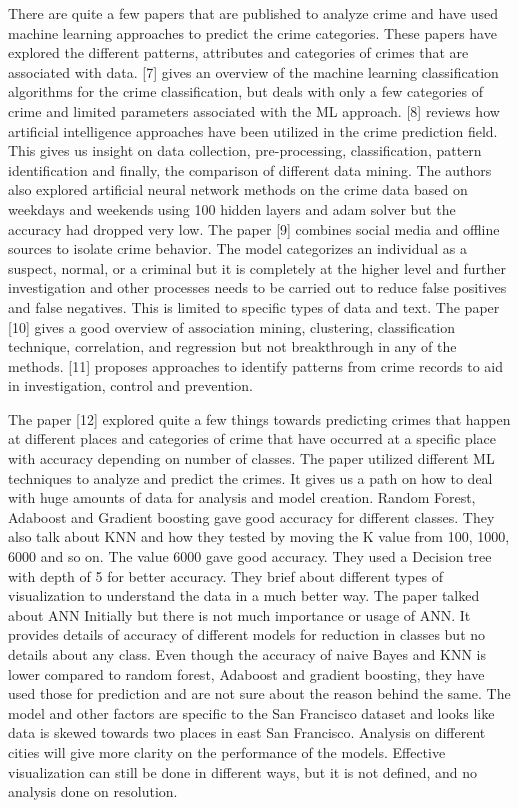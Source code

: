 \documentclass[11 pt,conference,final,]{IEEEtran}
\begin{document}
There are quite a few papers that are published to analyze crime and
have used machine learning approaches to predict the crime categories.
These papers have explored the different patterns, attributes and
categories of crimes that are associated with data. {[}7{]} gives an
overview of the machine learning classification algorithms for the crime
classification, but deals with only a few categories of crime and
limited parameters associated with the ML approach. {[}8{]} reviews how
artificial intelligence approaches have been utilized in the crime
prediction field. This gives us insight on data collection,
pre-processing, classification, pattern identification and finally, the
comparison of different data mining. The authors also explored
artificial neural network methods on the crime data based on weekdays
and weekends using 100 hidden layers and adam solver but the accuracy
had dropped very low. The paper {[}9{]} combines social media and
offline sources to isolate crime behavior. The model categorizes an
individual as a suspect, normal, or a criminal but it is completely at
the higher level and further investigation and other processes needs to
be carried out to reduce false positives and false negatives. This is
limited to specific types of data and text. The paper {[}10{]} gives a
good overview of association mining, clustering, classification
technique, correlation, and regression but not breakthrough in any of
the methods. {[}11{]} proposes approaches to identify patterns from
crime records to aid in investigation, control and prevention.

The paper {[}12{]} explored quite a few things towards predicting crimes
that happen at different places and categories of crime that have
occurred at a specific place with accuracy depending on number of
classes. The paper utilized different ML techniques to analyze and
predict the crimes. It gives us a path on how to deal with huge amounts
of data for analysis and model creation. Random Forest, Adaboost and
Gradient boosting gave good accuracy for different classes. They also
talk about KNN and how they tested by moving the K value from 100, 1000,
6000 and so on. The value 6000 gave good accuracy. They used a Decision
tree with depth of 5 for better accuracy. They brief about different
types of visualization to understand the data in a much better way. The
paper talked about ANN Initially but there is not much importance or
usage of ANN. It provides details of accuracy of different models for
reduction in classes but no details about any class. Even though the
accuracy of naive Bayes and KNN is lower compared to random forest,
Adaboost and gradient boosting, they have used those for prediction and
are not sure about the reason behind the same. The model and other
factors are specific to the San Francisco dataset and looks like data is
skewed towards two places in east San Francisco. Analysis on different
cities will give more clarity on the performance of the models.
Effective visualization can still be done in different ways, but it is
not defined, and no analysis done on resolution.
\end{document}

